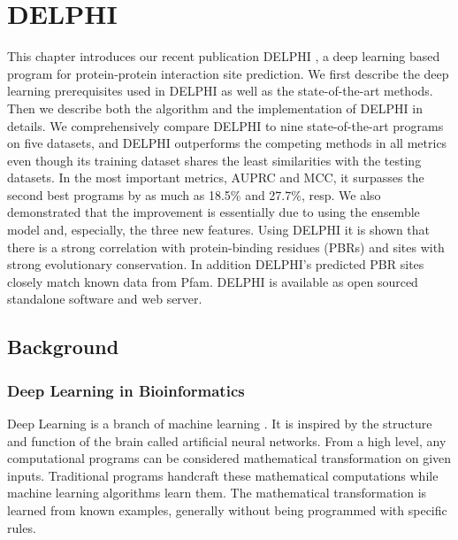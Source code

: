\chapter{DELPHI \label{chap_2}}
This chapter introduces our recent publication DELPHI \cite{li2020delphi, li2020delphi_ISMB}, a deep learning based program for protein-protein interaction site prediction. We first describe the deep learning prerequisites used in DELPHI as well as the state-of-the-art methods. Then we describe both the algorithm and the implementation of DELPHI in details. We comprehensively compare DELPHI to nine state-of-the-art programs on five datasets, and DELPHI outperforms the competing methods in all metrics even though its training dataset shares the least similarities with the testing datasets. In the most important metrics, AUPRC and MCC, it surpasses the second best programs by as much as 18.5\% and 27.7\%, resp. We also demonstrated that the improvement is essentially due to using the ensemble model and, especially, the three new features. Using DELPHI it is shown that there is a strong correlation with protein-binding residues (PBRs) and sites with strong evolutionary conservation.  In addition DELPHI's predicted PBR sites closely match known data from Pfam.
DELPHI is available as open sourced standalone software and web server.
\section{Background}
\subsection{Deep Learning in Bioinformatics} \label{set_AI_in_bioinfor}
Deep Learning is a branch of machine learning \cite{goodfellow2016deep}. It is inspired by the structure and function of the brain called artificial neural networks. From a high level, any computational programs can be considered mathematical transformation on given inputs. Traditional programs handcraft these mathematical computations while machine learning algorithms learn them. The mathematical transformation is learned from known examples, generally without being programmed with specific rules.

